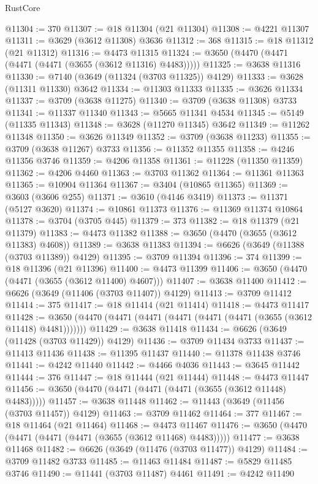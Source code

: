 \begin{lexlean}{RustCore}
\begin{coremodule}
@11304 := 370
@11307 := @18 @11304 (@21 @11304)
@11308 := @4221 @11307
@11311 := @3629 (@3612 @11308) @3636
@11312 := 368
@11315 := @18 @11312 (@21 @11312)
@11316 := @4473 @11315
@11324 := @3650 (@4470 (@4471 (@4471 (@4471 (@3655 (@3612 @11316) @4483)))))
@11325 := @3638 @11316
@11330 := @7140 (@3649 (@11324 (@3703 @11325)) @4129)
@11333 := @3628 (@11311 @11330) @3642
@11334 := @11303 @11333
@11335 := @3626 @11334
@11337 := @3709 (@3638 @11275)
@11340 := @3709 (@3638 @11308) @3733
@11341 := @11337 @11340
@11343 := @5665 @11341 @4534
@11345 := @5149 (@11335 @11343)
@11348 := @3628 (@11270 @11345) @3642
@11349 := @11262 @11348
@11350 := @3626 @11349
@11352 := @3709 (@3638 @11233)
@11355 := @3709 (@3638 @11267) @3733
@11356 := @11352 @11355
@11358 := @4246 @11356 @3746
@11359 := @4206 @11358
@11361 := @11228 (@11350 @11359)
@11362 := @4206 @4460
@11363 := @3703 @11362
@11364 := @11361 @11363
@11365 := @10904 @11364
@11367 := @3404 (@10865 @11365)
@11369 := @3603 (@3606 @255)
@11371 := @3610 (@4146 @3419)
@11373 := @11371 (@5127 @3620)
@11374 := @10861 @11373
@11376 := @11369 @11374 @10864
@11378 := @3704 (@3705 @445)
@11379 := 373
@11382 := @18 @11379 (@21 @11379)
@11383 := @4473 @11382
@11388 := @3650 (@4470 (@3655 (@3612 @11383) @4608))
@11389 := @3638 @11383
@11394 := @6626 (@3649 (@11388 (@3703 @11389)) @4129)
@11395 := @3709 @11394
@11396 := 374
@11399 := @18 @11396 (@21 @11396)
@11400 := @4473 @11399
@11406 := @3650 (@4470 (@4471 (@3655 (@3612 @11400) @4607)))
@11407 := @3638 @11400
@11412 := @6626 (@3649 (@11406 (@3703 @11407)) @4129)
@11413 := @3709 @11412
@11414 := 375
@11417 := @18 @11414 (@21 @11414)
@11418 := @4473 @11417
@11428 := @3650 (@4470 (@4471 (@4471 (@4471 (@4471 (@4471 (@3655 (@3612 @11418) @4481)))))))
@11429 := @3638 @11418
@11434 := @6626 (@3649 (@11428 (@3703 @11429)) @4129)
@11436 := @3709 @11434 @3733
@11437 := @11413 @11436
@11438 := @11395 @11437
@11440 := @11378 @11438 @3746
@11441 := @4242 @11440
@11442 := @4466 @4036
@11443 := @3645 @11442
@11444 := 376
@11447 := @18 @11444 (@21 @11444)
@11448 := @4473 @11447
@11456 := @3650 (@4470 (@4471 (@4471 (@4471 (@3655 (@3612 @11448) @4483)))))
@11457 := @3638 @11448
@11462 := @11443 (@3649 (@11456 (@3703 @11457)) @4129)
@11463 := @3709 @11462
@11464 := 377
@11467 := @18 @11464 (@21 @11464)
@11468 := @4473 @11467
@11476 := @3650 (@4470 (@4471 (@4471 (@4471 (@3655 (@3612 @11468) @4483)))))
@11477 := @3638 @11468
@11482 := @6626 (@3649 (@11476 (@3703 @11477)) @4129)
@11484 := @3709 @11482 @3733
@11485 := @11463 @11484
@11487 := @5829 @11485 @3746
@11490 := @11441 (@3703 @11487) @4461
@11491 := @4242 @11490

\end{coremodule}
\end{lexlean}

